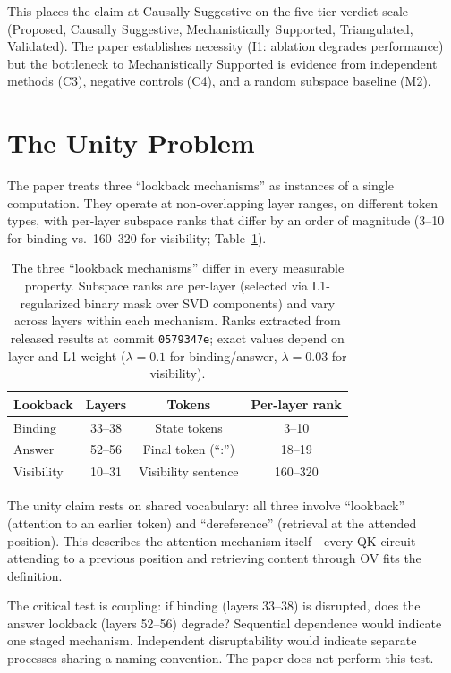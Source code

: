 \documentclass[11pt]{article}
\begin{document}
This places the claim at Causally Suggestive on the five-tier verdict scale (Proposed, Causally Suggestive, Mechanistically Supported, Triangulated, Validated). The paper establishes necessity (I1: ablation degrades performance) but the bottleneck to Mechanistically Supported is evidence from independent methods (C3), negative controls (C4), and a random subspace baseline (M2).


\section{The Unity Problem}
\label{sec:unity}

The paper treats three ``lookback mechanisms'' as instances of a single computation. They operate at non-overlapping layer ranges, on different token types, with per-layer subspace ranks that differ by an order of magnitude (3--10 for binding vs.\ 160--320 for visibility; Table~\ref{tab:unity}).

\begin{table}[t]
\centering
\caption{The three ``lookback mechanisms'' differ in every measurable property. Subspace ranks are per-layer (selected via L1-regularized binary mask over SVD components) and vary across layers within each mechanism. Ranks extracted from released results at commit \texttt{0579347e}; exact values depend on layer and L1 weight ($\lambda = 0.1$ for binding/answer, $\lambda = 0.03$ for visibility).}
\label{tab:unity}
\begin{tabular}{lccc}
\toprule
Lookback & Layers & Tokens & Per-layer rank \\
\midrule
Binding & 33--38 & State tokens & 3--10 \\
Answer & 52--56 & Final token (``:'') & 18--19 \\
Visibility & 10--31 & Visibility sentence & 160--320 \\
\bottomrule
\end{tabular}
\end{table}

The unity claim rests on shared vocabulary: all three involve ``lookback'' (attention to an earlier token) and ``dereference'' (retrieval at the attended position). This describes the attention mechanism itself---every QK circuit attending to a previous position and retrieving content through OV fits the definition.

The critical test is coupling: if binding (layers 33--38) is disrupted, does the answer lookback (layers 52--56) degrade? Sequential dependence would indicate one staged mechanism. Independent disruptability would indicate separate processes sharing a naming convention. The paper does not perform this test.
\end{document}
